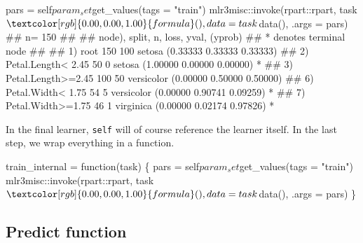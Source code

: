 \documentclass[12pt,]{scrbook}
\newenvironment{Shaded}{}{}
\newcommand{\ControlFlowTok}[1]{\textcolor[rgb]{0.00,0.00,1.00}{#1}}
\newcommand{\DataTypeTok}[1]{#1}
\newcommand{\KeywordTok}[1]{\textcolor[rgb]{0.00,0.00,1.00}{#1}}
\newcommand{\NormalTok}[1]{#1}
\newcommand{\OperatorTok}[1]{#1}
\newcommand{\StringTok}[1]{\textcolor[rgb]{0.00,0.50,0.50}{#1}}
\begin{document}
\begin{Shaded}
\begin{Highlighting}[]
\NormalTok{pars =}\StringTok{ }\NormalTok{self}\OperatorTok{$}\NormalTok{param_set}\OperatorTok{$}\KeywordTok{get_values}\NormalTok{(}\DataTypeTok{tags =} \StringTok{"train"}\NormalTok{)}
\NormalTok{mlr3misc}\OperatorTok{::}\KeywordTok{invoke}\NormalTok{(rpart}\OperatorTok{::}\NormalTok{rpart, task}\OperatorTok{$}\KeywordTok{formula}\NormalTok{(), }\DataTypeTok{data =}\NormalTok{ task}\OperatorTok{$}\KeywordTok{data}\NormalTok{(), }
  \DataTypeTok{.args =}\NormalTok{ pars)}
\NormalTok{## n= 150 }
\NormalTok{## }
\NormalTok{## node), split, n, loss, yval, (yprob)}
\NormalTok{##       * denotes terminal node}
\NormalTok{## }
\NormalTok{## 1) root 150 100 setosa (0.33333 0.33333 0.33333)  }
\NormalTok{##   2) Petal.Length< 2.45 50   0 setosa (1.00000 0.00000 0.00000) *}
\NormalTok{##   3) Petal.Length>=2.45 100  50 versicolor (0.00000 0.50000 0.50000)  }
\NormalTok{##     6) Petal.Width< 1.75 54   5 versicolor (0.00000 0.90741 0.09259) *}
\NormalTok{##     7) Petal.Width>=1.75 46   1 virginica (0.00000 0.02174 0.97826) *}
\end{Highlighting}
\end{Shaded}

In the final learner, \texttt{self} will of course reference the learner itself.
In the last step, we wrap everything in a function.

\begin{Shaded}
\begin{Highlighting}[]
\NormalTok{train_internal =}\StringTok{ }\ControlFlowTok{function}\NormalTok{(task) \{}
\NormalTok{  pars =}\StringTok{ }\NormalTok{self}\OperatorTok{$}\NormalTok{param_set}\OperatorTok{$}\KeywordTok{get_values}\NormalTok{(}\DataTypeTok{tags =} \StringTok{"train"}\NormalTok{)}
\NormalTok{  mlr3misc}\OperatorTok{::}\KeywordTok{invoke}\NormalTok{(rpart}\OperatorTok{::}\NormalTok{rpart, task}\OperatorTok{$}\KeywordTok{formula}\NormalTok{(), }\DataTypeTok{data =}\NormalTok{ task}\OperatorTok{$}\KeywordTok{data}\NormalTok{(), }
    \DataTypeTok{.args =}\NormalTok{ pars)}
\NormalTok{\}}
\end{Highlighting}
\end{Shaded}

\hypertarget{learner-predict}{%
\subsection{Predict function}\label{learner-predict}}
\end{document}
